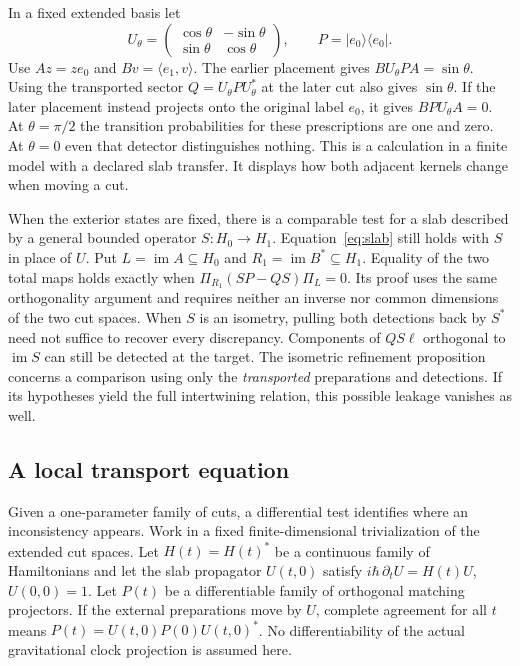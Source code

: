 \documentclass[11pt,letterpaper]{article}
\newcommand{\im}{\operatorname{im}}
\begin{document}
\begin{example}
In a fixed extended basis let
\[
 U_\theta=
 \begin{pmatrix}\cos\theta&-\sin\theta\\
                 \sin\theta&\cos\theta\end{pmatrix},
 \qquad P=|e_0\rangle\langle e_0|.
\]
Use \(A z=z e_0\) and \(B v=\langle e_1,v\rangle\).
The earlier placement gives \(B U_\theta P A=\sin\theta\).
Using the transported sector
\(Q=U_\theta P U_\theta^*\) at the later cut also gives \(\sin\theta\).
If the later placement instead projects onto the original label \(e_0\),
it gives \(B P U_\theta A=0\). At \(\theta=\pi/2\) the transition
probabilities for these prescriptions are one and zero. At
\(\theta=0\) even that detector distinguishes nothing. This is a
calculation in a finite model with a declared slab transfer. It displays
how both adjacent kernels change when moving a cut.
\end{example}

When the exterior states are fixed, there is a comparable test for a
slab described by a general bounded operator \(S:H_0\to H_1\).
Equation~\eqref{eq:slab} still holds with \(S\) in place of \(U\).
Put \(L=\im A\subseteq H_0\) and \(R_1=\im B^*\subseteq H_1\).
Equality of the two total maps holds exactly when
\(\Pi_{R_1}(SP-QS)\Pi_L=0\).
Its proof uses the same orthogonality argument and requires neither an
inverse nor common dimensions of the two cut spaces. When \(S\) is an
isometry, pulling both detections back by \(S^*\) need not suffice to
recover every discrepancy. Components of \(QS\ell\) orthogonal to
\(\im S\) can still be detected at the target. The isometric refinement
proposition concerns a comparison using only the \emph{transported}
preparations and detections. If its hypotheses yield the full
intertwining relation, this possible leakage vanishes as well.

\subsection{A local transport equation}
Given a one-parameter family of cuts, a differential test identifies
where an inconsistency appears. Work in a fixed finite-dimensional
trivialization of the extended cut spaces. Let \(H(t)=H(t)^*\) be a
continuous family of Hamiltonians and let the slab propagator \(U(t,0)\)
satisfy \(i\hbar\,\partial_tU=H(t)U\), \(U(0,0)=1\). Let \(P(t)\) be a
differentiable family of orthogonal matching projectors. If the external
preparations move by \(U\), complete agreement for all \(t\) means
\(P(t)=U(t,0)P(0)U(t,0)^*\). No differentiability of the actual
gravitational clock projection is assumed here.
\end{document}
